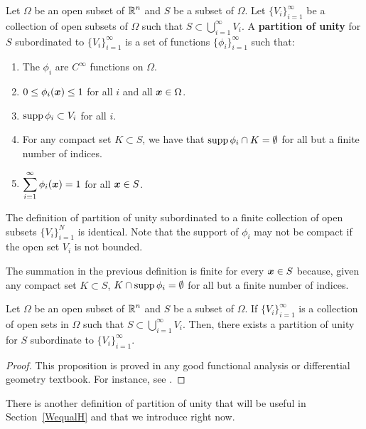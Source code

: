 \begin{defn} \label{pot_part_unity}
Let $\Omega$ be an open subset of $\displaystyle \mathbb{R}^n$ and $S$ be a subset of
$\Omega$.  Let $\displaystyle \{V_i\}_{i=1}^\infty$ be a collection of
open subsets of $\Omega$ such that
$\displaystyle S \subset \bigcup_{i=1}^\infty V_i$.
A {\bfseries partition of unity}
for $S$ subordinated to $\displaystyle \{V_i\}_{i=1}^\infty$ is a set
of functions $\displaystyle \{\phi_i\}_{i=1}^\infty$ such that:
\begin{enumerate}
\item The $\phi_i$ are $\displaystyle C^\infty$ functions on $\Omega$.
\item $0 \leq \phi_i({\bm{x}}) \leq 1$ for all $i$ and all ${\bm{x}} \in \Omega$.
\item $\operatorname{supp} \phi_i \subset V_i$ for all $i$.
\item For any compact set $K \subset S$, we have that
$\operatorname{supp} \phi_i \cap K = \emptyset$ for all but a finite number of indices.
\item $\displaystyle \sum_{i=1}^\infty \phi_i({\bm{x}}) = 1$ for all
${\bm{x}}\in S$.
\end{enumerate}
The definition of partition of unity subordinated to a finite
collection of open subsets $\displaystyle \{V_i\}_{i=1}^N$ is identical.
Note that the support of $\phi_i$ may not be compact if the open set
$V_i$ is not bounded.
\end{defn}

The summation in the previous definition is finite for every
${\bm{x}} \in S$ because, given any compact set $K\subset S$,
$K\cap \operatorname{supp} \phi_i = \emptyset$ for all but a finite number of indices.

\begin{prop}
Let $\Omega$ be an open subset of $\displaystyle \mathbb{R}^n$ and $S$ be a subset of
$\Omega$.  If $\displaystyle \{ V_i\}_{i=1}^\infty$ is a collection
of open sets in $\Omega$ such that
$\displaystyle S \subset \bigcup_{i=1}^\infty V_i$.
Then, there exists a partition of unity for $S$
subordinate to $\displaystyle \{ V_i\}_{i=1}^\infty$.
\end{prop}

\begin{proof}
This proposition is proved in any good functional analysis or
differential geometry textbook.  For instance, see \cite{Ad}. 
\end{proof}

There is another definition of partition of unity that will be useful
in Section~\ref{WequalH} and that we introduce right now.

